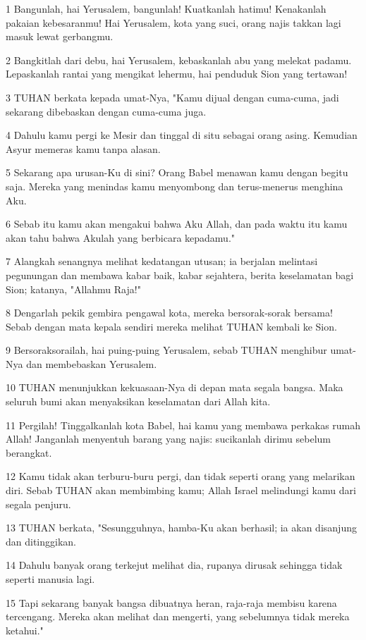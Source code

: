 \par 1 Bangunlah, hai Yerusalem, bangunlah! Kuatkanlah hatimu! Kenakanlah pakaian kebesaranmu! Hai Yerusalem, kota yang suci, orang najis takkan lagi masuk lewat gerbangmu.
\par 2 Bangkitlah dari debu, hai Yerusalem, kebaskanlah abu yang melekat padamu. Lepaskanlah rantai yang mengikat lehermu, hai penduduk Sion yang tertawan!
\par 3 TUHAN berkata kepada umat-Nya, "Kamu dijual dengan cuma-cuma, jadi sekarang dibebaskan dengan cuma-cuma juga.
\par 4 Dahulu kamu pergi ke Mesir dan tinggal di situ sebagai orang asing. Kemudian Asyur memeras kamu tanpa alasan.
\par 5 Sekarang apa urusan-Ku di sini? Orang Babel menawan kamu dengan begitu saja. Mereka yang menindas kamu menyombong dan terus-menerus menghina Aku.
\par 6 Sebab itu kamu akan mengakui bahwa Aku Allah, dan pada waktu itu kamu akan tahu bahwa Akulah yang berbicara kepadamu."
\par 7 Alangkah senangnya melihat kedatangan utusan; ia berjalan melintasi pegunungan dan membawa kabar baik, kabar sejahtera, berita keselamatan bagi Sion; katanya, "Allahmu Raja!"
\par 8 Dengarlah pekik gembira pengawal kota, mereka bersorak-sorak bersama! Sebab dengan mata kepala sendiri mereka melihat TUHAN kembali ke Sion.
\par 9 Bersoraksorailah, hai puing-puing Yerusalem, sebab TUHAN menghibur umat-Nya dan membebaskan Yerusalem.
\par 10 TUHAN menunjukkan kekuasaan-Nya di depan mata segala bangsa. Maka seluruh bumi akan menyaksikan keselamatan dari Allah kita.
\par 11 Pergilah! Tinggalkanlah kota Babel, hai kamu yang membawa perkakas rumah Allah! Janganlah menyentuh barang yang najis: sucikanlah dirimu sebelum berangkat.
\par 12 Kamu tidak akan terburu-buru pergi, dan tidak seperti orang yang melarikan diri. Sebab TUHAN akan membimbing kamu; Allah Israel melindungi kamu dari segala penjuru.
\par 13 TUHAN berkata, "Sesungguhnya, hamba-Ku akan berhasil; ia akan disanjung dan ditinggikan.
\par 14 Dahulu banyak orang terkejut melihat dia, rupanya dirusak sehingga tidak seperti manusia lagi.
\par 15 Tapi sekarang banyak bangsa dibuatnya heran, raja-raja membisu karena tercengang. Mereka akan melihat dan mengerti, yang sebelumnya tidak mereka ketahui."

